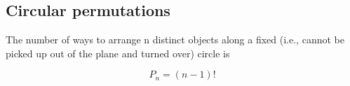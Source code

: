 \subsection{Circular permutations}

The number of ways to arrange n distinct objects along a fixed (i.e., cannot be picked up out of the plane and turned over) circle is

\begin{equation}
        P_n=(n-1)!
\end{equation}
